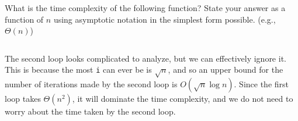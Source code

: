 \begin{prob}
    What is the time complexity of the following function? 
    State your answer as a function of $n$ using asymptotic notation in 
    the simplest form possible. (e.g., $\Theta(n)$)

    \inputminted{python}{code.py}


    \begin{soln}
        The second loop looks complicated to analyze, but we can effectively
        ignore it. This is because the most \texttt{i} can ever be is $\sqrt
        n$, and so an upper bound for the number of iterations made by the
        second loop is $O(\sqrt n \log n)$. Since the first loop takes
        $\Theta(n^2)$, it will dominate the time complexity, and we do not need
        to worry about the time taken by the second loop.
    \end{soln}

\end{prob}
